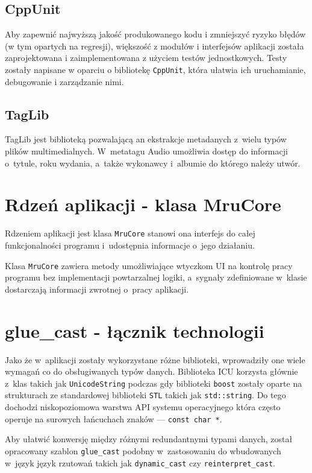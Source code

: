 \subsection{CppUnit}
\par
Aby zapewnić najwyższą jakość produkowanego kodu i zmniejszyć ryzyko błędów (w tym opartych na regresji), większość z modułów i interfejsów aplikacji została zaprojektowana i zaimplementowana z użyciem testów jednostkowych. Testy zostały napisane w oparciu o bibliotekę \texttt{CppUnit}, która ułatwia ich uruchamianie, debugowanie i zarządzanie nimi.

\subsection{TagLib}
TagLib jest biblioteką pozwalającą an ekstrakcje metadanych z~wielu typów plików multimedialnych. W~metatagu Audio umożliwia dostęp do informacji o~tytule, roku wydania, a~także wykonawcy i~albumie do którego należy utwór.

\section{Rdzeń aplikacji - klasa MruCore}
Rdzeniem aplikacji jest klasa \texttt{MruCore} stanowi ona interfejs do całej funkcjonalności programu i~udostępnia informacje o~jego działaniu.
\par
Klasa \texttt{MruCore} zawiera metody umożliwiające wtyczkom UI na kontrolę pracy programu bez implementacji powtarzalnej logiki, a~sygnały zdefiniowane w~klasie dostarczają informacji zwrotnej o~pracy aplikacji.

\section{glue\_cast - łącznik technologii}
Jako że w~aplikacji zostały wykorzystane różne biblioteki, wprowadziły one wiele wymagań co do obsługiwanych typów danych.
Biblioteka ICU korzysta głównie z~klas takich jak \texttt{UnicodeString} podczas gdy biblioteki \texttt{boost} zostały oparte na strukturach ze standardowej biblioteki \texttt{STL} takich jak \texttt{std::string}. Do tego dochodzi niskopoziomowa warstwa API systemu operacyjnego która często operuje na surowych łańcuchach znaków --- \texttt{const char *}.
\par
Aby ułatwić konwersję między różnymi redundantnymi typami danych, został opracowany szablon \texttt{glue\_cast} podobny w~zastosowaniu do wbudowanych w~język język rzutowań takich jak \texttt{dynamic\_cast} czy \texttt{reinterpret\_cast}.

